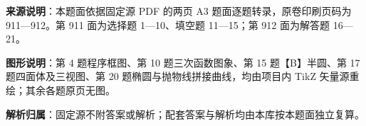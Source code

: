 

\begin{gknotice}
\textbf{来源说明}：本题面依据固定源 PDF 的两页 A3 题面逐题转录，原卷印刷页码为 911—912。第 911 面为选择题 1—10、填空题 11—15；第 912 面为解答题 16—21。

\textbf{图形说明}：第 4 题程序框图、第 10 题三次函数图象、第 15 题【B】半圆、第 17 题四面体及三视图、第 20 题椭圆与抛物线拼接曲线，均由项目内 TikZ 矢量源重绘；其余各题原页无图。

\textbf{解析归属}：固定源不附答案或解析；配套答案与解析均由本库按本题面独立复算。
\end{gknotice}


